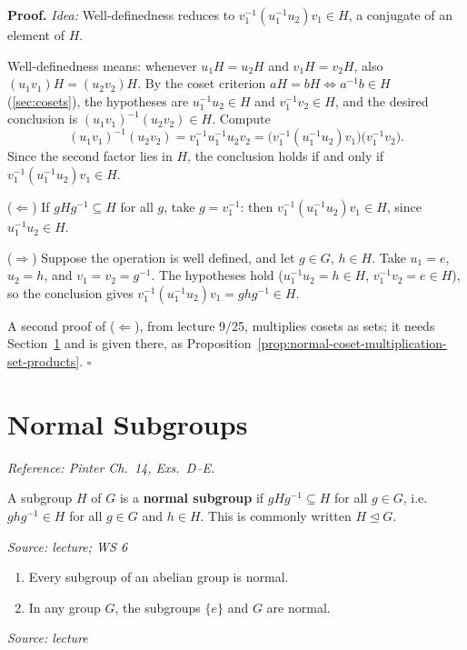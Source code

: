 \documentclass[11pt]{report}
\renewenvironment{proof}[1][Proof]{\noindent\textbf{#1.} }{\hfill$\square$\par\vspace{5pt}}
\newcommand{\srcline}[1]{\par\hfill{\footnotesize\textit{Source: #1}}}
\begin{document}
\begin{proof}
\textit{Idea:} Well-definedness reduces to $v_1^{-1}(u_1^{-1}u_2)v_1 \in H$, a conjugate of an element of $H$.\par
Well-definedness means: whenever $u_1H = u_2H$ and $v_1H = v_2H$, also $(u_1v_1)H = (u_2v_2)H$. By the coset criterion $aH = bH \iff a^{-1}b \in H$ (\ref{sec:cosets}), the hypotheses are $u_1^{-1}u_2 \in H$ and $v_1^{-1}v_2 \in H$, and the desired conclusion is $(u_1v_1)^{-1}(u_2v_2) \in H$. Compute
\[ (u_1v_1)^{-1}(u_2v_2) = v_1^{-1}u_1^{-1}u_2v_2 = \big(v_1^{-1}(u_1^{-1}u_2)v_1\big)\big(v_1^{-1}v_2\big). \]
Since the second factor lies in $H$, the conclusion holds if and only if $v_1^{-1}(u_1^{-1}u_2)v_1 \in H$.

($\Leftarrow$) If $gHg^{-1} \subseteq H$ for all $g$, take $g = v_1^{-1}$: then $v_1^{-1}(u_1^{-1}u_2)v_1 \in H$, since $u_1^{-1}u_2 \in H$.

($\Rightarrow$) Suppose the operation is well defined, and let $g \in G$, $h \in H$. Take $u_1 = e$, $u_2 = h$, and $v_1 = v_2 = g^{-1}$. The hypotheses hold ($u_1^{-1}u_2 = h \in H$, $v_1^{-1}v_2 = e \in H$), so the conclusion gives $v_1^{-1}(u_1^{-1}u_2)v_1 = ghg^{-1} \in H$.

A second proof of ($\Leftarrow$), from lecture 9/25, multiplies cosets as sets; it needs Section~\ref{sec:normal} and is given there, as Proposition~\ref{prop:normal-coset-multiplication-set-products}.
\end{proof}

\section{Normal Subgroups}\label{sec:normal}

\textit{Reference: Pinter Ch.\ 14, Exs.\ D--E.}

\begin{defbox}\label{def:normal-subgroup}
A subgroup $H$ of $G$ is a \textbf{normal subgroup} if $gHg^{-1} \subseteq H$ for all $g \in G$, i.e.\ $ghg^{-1} \in H$ for all $g \in G$ and $h \in H$. This is commonly written $H \trianglelefteq G$.
\srcline{lecture; WS 6}
\end{defbox}

\begin{propbox}\label{prop:first-examples-normal-subgroups}
\begin{enumerate}
    \item Every subgroup of an abelian group is normal.
    \item In any group $G$, the subgroups $\{e\}$ and $G$ are normal.
\end{enumerate}
\srcline{lecture}
\end{propbox}
\end{document}
